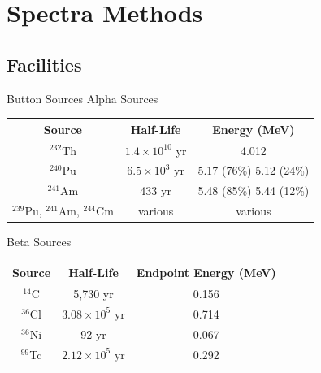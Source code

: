 
% 
%
\section{Spectra Methods}


\subsection{Facilities}
\begin{frame}{Button Sources}
	\centering
	Alpha Sources
	\begin{table}[h]
		\tiny
		\begin{tabular}{c | c c}
		Source & Half-Life & Energy (MeV) \\
		\hline
		\hline
		${}^{232}$Th & $1.4\times10^{10}$ yr & 4.012 \\
		${}^{240}$Pu & $6.5\times10^{3}$ yr & 5.17 (76\%) 5.12 (24\%) \\
		${}^{241}$Am & 433 yr & 5.48 (85\%) 5.44 (12\%) \\
		${}^{239}$Pu, ${}^{241}$Am, ${}^{244}$Cm  & various & various \\
		\end{tabular}
	\end{table}
	Beta Sources
	\begin{table}[h]
		\tiny
		\begin{tabular}{c | c c}
		Source & Half-Life & Endpoint Energy (MeV)\\
		\hline
		\hline
		${}^{14}$C &  5,730 yr & 0.156 \\
		${}^{36}$Cl & $3.08\times10^{5}$ yr & 0.714 \\
		${}^{36}$Ni &  92 yr & 0.067 \\
		${}^{99}$Tc & $2.12\times10^{5}$ yr & 0.292 \\
		\end{tabular}
	\end{table}
\end{frame}

